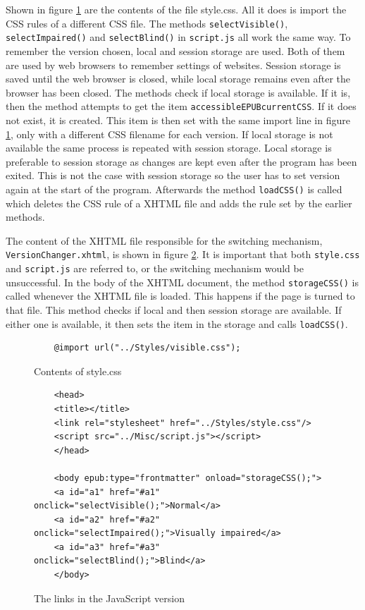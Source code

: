 Shown in figure \ref{fig:jsStyleCss} are the contents of the file style.css. All it does is import the CSS rules of a different CSS file. The methods \lstinline|selectVisible()|, \lstinline|selectImpaired()| and \lstinline|selectBlind()| in \lstinline|script.js| all work the same way. To remember the version chosen, local and session storage are used. Both of them are used by web browsers to remember settings of websites. Session storage is saved until the web browser is closed, while local storage remains even after the browser has been closed. The methods check if local storage is available. If it is, then the method attempts to get the item \lstinline|accessibleEPUBcurrentCSS|. If it does not exist, it is created. This item is then set with the same import line in figure \ref{fig:jsStyleCss}, only with a different CSS filename for each version. If local storage is not available the same process is repeated with session storage. Local storage is preferable to session storage as changes are kept even after the program has been exited. This is not the case with session storage so the user has to set version again at the start of the program. Afterwards the method \lstinline|loadCSS()| is called which deletes the CSS rule of a XHTML file and adds the rule set by the earlier methods.

The content of the XHTML file responsible for the switching mechanism, \lstinline|VersionChanger.xhtml|, is shown in figure \ref{fig:js_switch}. It is important that both \lstinline|style.css| and \lstinline|script.js| are referred to, or the switching mechanism would be unsuccessful. In the body of the XHTML document, the method \lstinline{storageCSS()} is called whenever the XHTML file is loaded. This happens if the page is turned to that file. This method checks if local and then session storage are available. If either one is available, it then sets the item in the storage and calls \lstinline{loadCSS()}.

\begin{figure}
	
	\begin{lstlisting}
	@import url("../Styles/visible.css");
	\end{lstlisting}
	\caption{Contents of style.css}
	\label{fig:jsStyleCss}
\end{figure}

\begin{figure}
	
	\begin{lstlisting}
	<head>
	<title></title>
	<link rel="stylesheet" href="../Styles/style.css"/>
	<script src="../Misc/script.js"></script>
	</head>
	
	<body epub:type="frontmatter" onload="storageCSS();">
	<a id="a1" href="#a1" onclick="selectVisible();">Normal</a>
	<a id="a2" href="#a2" onclick="selectImpaired();">Visually impaired</a>
	<a id="a3" href="#a3" onclick="selectBlind();">Blind</a>
	</body>
	\end{lstlisting}
	\caption{The links in the JavaScript version}
	\label{fig:js_switch}
\end{figure}


